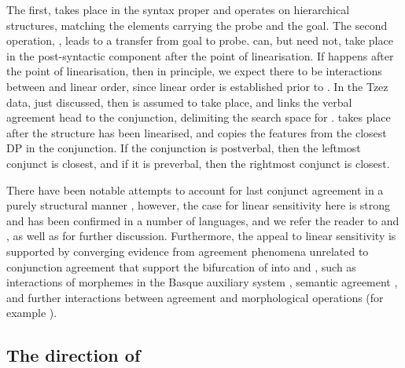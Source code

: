 \documentclass[output=paper
,modfonts
,nonflat]{langsci/langscibook}
\begin{document}
\noindent The first, \agrl {} takes place in the syntax proper and operates on hierarchical structures, matching the elements carrying the probe and the goal.
The second operation, \agrc {}, leads to a transfer from goal to probe.
\agrc {}  can, but need not, take place in the post-syntactic component after the point of linearisation. If \agrc {} happens after the point of linearisation, then in principle, we expect there to be interactions between \agrc {} and linear order, since linear order is established prior to \agrc.
In the Tzez data, just discussed, then \agrl {} is assumed to take place, and links the verbal agreement head to the conjunction, delimiting the search space for \agrc {} \citep[cf.][]{bhattwalkow2013}.
\agrc {} takes place after the structure has been linearised, and copies the features from the closest DP in the conjunction.
If the conjunction is postverbal, then the leftmost conjunct is closest, and if it is preverbal, then the rightmost conjunct is closest.

There have been notable attempts to account for last conjunct agreement in a purely structural manner \citep{johannessen1996,boskovic2009}, however, the case for linear sensitivity here is strong and has been confirmed in a number of languages, and we refer the reader to \citet{marusicetal2015} and \citet{emsspnas}, as well as  for further discussion.
Furthermore, the appeal to linear sensitivity is supported by converging evidence from agreement phenomena unrelated to conjunction agreement that support the bifurcation of \agr {} into \agrc {} and \agrl, such as interactions of morphemes in the Basque auxiliary system \citep{arreginevins2012}, semantic agreement \citep{smithdiss,smithagrhierarchy}, and further interactions between agreement and morphological operations (for example ).

\subsection{The direction of \agr}
\label{sec:direction}
\end{document}
